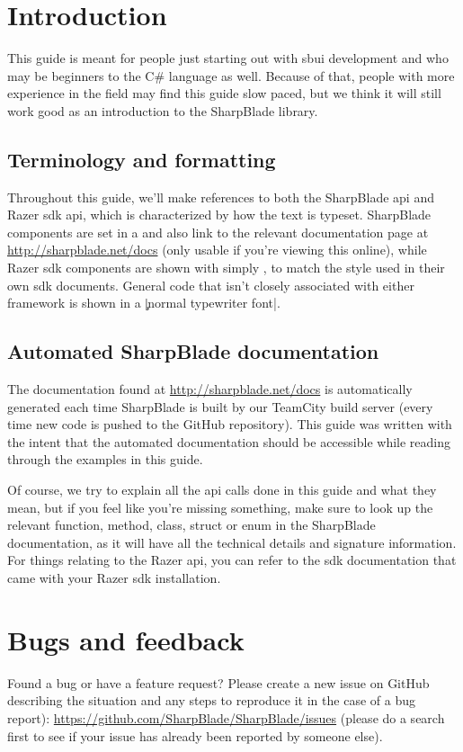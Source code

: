 \chapter{Introduction}
This guide is meant for people just starting out with \gls{sbui} development and who may be beginners to the C\# language as well. Because of that, people with more experience in the field may find this guide slow paced, but we think it will still work good as an introduction to the SharpBlade library.

\section{Terminology and formatting}
Throughout this guide, we'll make references to both the SharpBlade \gls{api} and Razer \gls{sdk} \gls{api}, which is characterized by how the text is typeset. SharpBlade components are set in a  and also link to the relevant documentation page at \url{http://sharpblade.net/docs} (only usable if you're viewing this online), while Razer \gls{sdk} components are shown with simply , to match the style used in their own \gls{sdk} documents. General code that isn't closely associated with either framework is shown in a \c|normal typewriter font|.

\section{Automated SharpBlade documentation}
The documentation found at \url{http://sharpblade.net/docs} is automatically generated each time SharpBlade is built by our TeamCity build server (every time new code is pushed to the GitHub repository). This guide was written with the intent that the automated documentation should be accessible while reading through the examples in this guide.

Of course, we try to explain all the \gls{api} calls done in this guide and what they mean, but if you feel like you're missing something, make sure to look up the relevant function, method, class, struct or enum in the SharpBlade documentation, as it will have all the technical details and signature information. For things relating to the Razer \gls{api}, you can refer to the \gls{sdk} documentation that came with your Razer \gls{sdk} installation.

\chapter{Bugs and feedback}
Found a bug or have a feature request? Please create a new issue on GitHub describing the situation and any steps to reproduce it in the case of a bug report): \url{https://github.com/SharpBlade/SharpBlade/issues} (please do a search first to see if your issue has already been reported by someone else).

